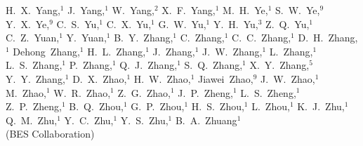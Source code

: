 {H.~X.~Yang,$^1$  J.~Yang,$^1$     
W.~Yang,$^2$
X.~F.~Yang,$^1$  M.~H.~Ye,$^1$    S.~W.~Ye,$^{9}$
Y.~X.~Ye,$^{9}$   C.~S.~Yu,$^1$    C.~X.~Yu,$^1$     G.~W.~Yu,$^1$
Y.~H.~Yu,$^3$    Z.~Q.~Yu,$^1$    C.~Z.~Yuan,$^1$   Y.~Yuan,$^1$
B.~Y.~Zhang,$^1$ C.~Zhang,$^1$    C.~C.~Zhang,$^1$ D.~H.~Zhang,$^1$ 
Dehong~Zhang,$^1$
H.~L.~Zhang,$^1$ J.~Zhang,$^1$    J.~W.~Zhang,$^1$  L.~Zhang,$^1$
L.~S.~Zhang,$^1$ P.~Zhang,$^1$
Q.~J.~Zhang,$^1$ S.~Q.~Zhang,$^1$ X.~Y.~Zhang,$^5$  Y.~Y.~Zhang,$^1$
D.~X.~Zhao,$^1$  H.~W.~Zhao,$^1$  Jiawei~Zhao,$^{9}$ J.~W.~Zhao,$^1$
M.~Zhao,$^1$     W.~R.~Zhao,$^1$  Z.~G.~Zhao,$^1$   J.~P.~Zheng,$^1$
L.~S.~Zheng,$^1$ Z.~P.~Zheng,$^1$ B.~Q.~Zhou,$^1$   G.~P.~Zhou,$^1$
H.~S.~Zhou,$^1$  L.~Zhou,$^1$     K.~J.~Zhu,$^1$    Q.~M.~Zhu,$^1$
Y.~C.~Zhu,$^1$   Y.~S.~Zhu,$^1$   B.~A.~Zhuang$^1$
\\ (BES Collaboration)}

\address{
$^1$Institute of High Energy Physics, Beijing 100039, People's Republic of
 China\\
$^2$Colorado State University, Fort Collins, Colorado 80523\\
$^3$Hangzhou University, Hangzhou 310028, People's Republic of China\\
$^4$Peking University, Beijing 100871, People's Republic of China\\
$^5$Shandong University, Jinan 250100, People's Republic of China\\
$^6$Shanghai Jiaotong University, Shanghai 200030, People's Republic of China\\
$^7$Stanford Linear Accelerator Center, Stanford, California 94309\\
$^8$University of Hawaii, Honolulu, Hawaii 96822\\
$^{9}$University of Science and Technology of China, Hefei 230026,
People's Republic of China\\
$^{10}$University of Texas at Dallas, Richardson, Texas 75083-0688}

\date{\today}

\maketitle

\begin{abstract}
Using the upgraded Beijing Spectrometer (BESII), 
we have measured the total cross section for $e^+e^-$ annihilation 
into hadronic final states at
center-of-mass energies of 2.6, 3.2, 3.4, 3.55, 4.6 and 
5.0 GeV.  Values of $R$, $\sigma(e^+e^-\rightarrow
\mbox{hadrons})/\sigma(e^+e^-\rightarrow\mu^+\mu^-)$, are determined.
\end{abstract}
\nopagebreak
\vspace*{0.3cm}

